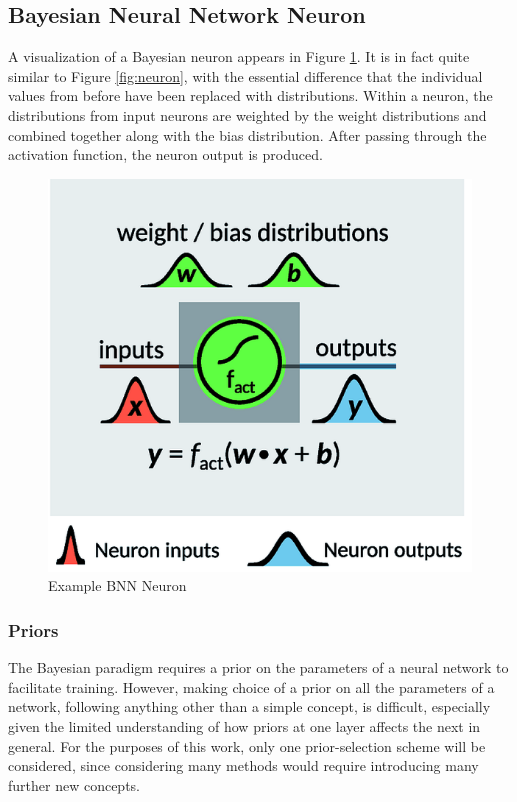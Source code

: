 \documentclass[12pt]{article}
\begin{document}
\subsection{Bayesian Neural Network Neuron}

A visualization of a Bayesian neuron appears in Figure \ref{fig:bnn-neuron}. It is in fact quite similar to Figure \ref{fig:neuron}, with the essential difference that the individual values from before have been replaced with distributions. Within a neuron, the distributions from input neurons are weighted by the weight distributions and combined together along with the bias distribution. After passing through the activation function, the neuron output is produced. 

\begin{figure}[H]
	\centering
	\includegraphics[width=.55\textwidth]{../Images/BNN-neuron.png}
	\caption{Example BNN Neuron \cite{hase2019machine}}
	\label{fig:bnn-neuron}
\end{figure}

\subsubsection{Priors}

The Bayesian paradigm requires a prior on the parameters of a neural network to facilitate training. However, making choice of a prior on all the parameters of a network, following anything other than a simple concept, is difficult, especially given the limited understanding of how priors at one layer affects the next in general. For the purposes of this work, only one prior-selection scheme will be considered, since considering many methods would require introducing many further new concepts. 
\end{document}
